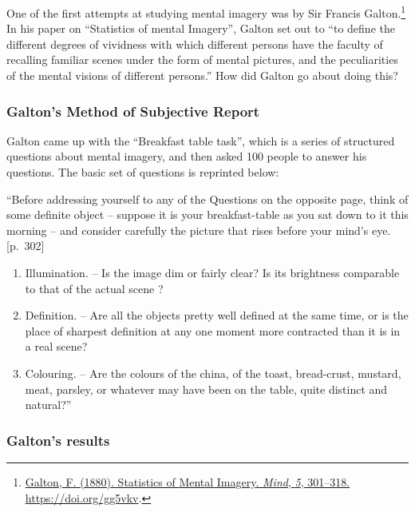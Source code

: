 \documentclass[
  oneside,
  12pt]{crumpbook}
\providecommand{\tightlist}{%
  \setlength{\itemsep}{0pt}\setlength{\parskip}{0pt}}
\begin{document}
One of the first attempts at studying mental imagery was by Sir Francis Galton.\footnote{\protect\hyperlink{ref-galtonStatisticsMentalImagery1880}{Galton, F. (1880). Statistics of {Mental Imagery}. \emph{Mind}, \emph{5}, 301--318. \url{https://doi.org/gg5vkv}}.} In his paper on ``Statistics of mental Imagery'', Galton set out to ``to define the different degrees of vividness with which different persons have the faculty of recalling familiar scenes under the form of mental pictures, and the peculiarities of the mental visions of different persons.'' How did Galton go about doing this?

\hypertarget{galtons-method-of-subjective-report}{%
\subsubsection{Galton's Method of Subjective Report}\label{galtons-method-of-subjective-report}}

Galton came up with the ``Breakfast table task'', which is a series of structured questions about mental imagery, and then asked 100 people to answer his questions. The basic set of questions is reprinted below:

``Before addressing yourself to any of the Questions on the opposite page, think of some definite object -- suppose it is your breakfast-table as you sat down to it this morning -- and consider carefully the picture that rises before your mind's eye. {[}p.~302{]}

\begin{enumerate}
\def\labelenumi{\arabic{enumi}.}
\tightlist
\item
  Illumination. -- Is the image dim or fairly clear? Is its brightness comparable to that of the actual scene ?
\item
  Definition. -- Are all the objects pretty well defined at the same time, or is the place of sharpest definition at any one moment more contracted than it is in a real scene?
\item
  Colouring. -- Are the colours of the china, of the toast, bread-crust, mustard, meat, parsley, or whatever may have been on the table, quite distinct and natural?''
\end{enumerate}

\hypertarget{galtons-results}{%
\subsubsection{Galton's results}\label{galtons-results}}
\end{document}
